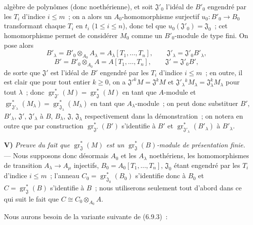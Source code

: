
algèbre de polynômes (donc noethérienne), et soit $\mathfrak J'_0$ l'idéal de
$B'_0$ engendré par les $T_i$ d'indice $i\leq m$~; on a alors un
$A_0$-homomorphisme surjectif $u_0:B'_0\to B_0$ transformant chaque $T_i$ en
$t_i$ ($1\leq i\leq n$), donc tel que $u_0(\mathfrak J'_0)=\mathfrak J_0$~;
cet homomorphisme permet de considérer $M_0$ comme un $B'_0$-module de type
fini. On pose alors
\[
B'_\lambda=B'_0\otimes_{A_0}A_\lambda
=A_\lambda[T_1,\ldots,T_n],\qquad
\mathfrak J'_\lambda=\mathfrak J'_0B'_\lambda,
\]
\[
B'=B'_0\otimes_{A_0}A=A[T_1,\ldots,T_n],\qquad
\mathfrak J'=\mathfrak J'_0B',
\]
de sorte que $\mathfrak J'$ est l'idéal de $B'$ engendré par les $T_i$
d'indice $i\leq m$~; en outre, il est clair que pour tout entier $k\geq0$,
on a $\mathfrak J'^kM=\mathfrak J^kM$ et
$\mathfrak J'_\lambda{}^kM_\lambda=\mathfrak J_\lambda^kM_\lambda$ pour tout
$\lambda$~; donc
$\operatorname{gr}_{\mathfrak J'}^*(M)=\operatorname{gr}_{\mathfrak J}^*(M)$
en tant que $A$-module et
$\operatorname{gr}_{\mathfrak J'_\lambda}^*(M_\lambda)
=\operatorname{gr}_{\mathfrak J_\lambda}^*(M_\lambda)$ en tant que
$A_\lambda$-module~; on peut donc substituer $B'$, $B'_\lambda$,
$\mathfrak J'$, $\mathfrak J'_\lambda$ à $B$, $B_\lambda$, $\mathfrak J$,
$\mathfrak J_\lambda$ respectivement dans la démonstration~; on notera en
outre que par construction $\operatorname{gr}_{\mathfrak J'}^*(B')$
s'identifie à $B'$ et $\operatorname{gr}_{\mathfrak J'_\lambda}^*(B'_\lambda)$
à $B'_\lambda$.

\medskip
\noindent\textbf{V)} \emph{Preuve du fait que
$\operatorname{gr}_{\mathfrak J}^*(M)$ est un
$\operatorname{gr}_{\mathfrak J}^*(B)$-module de présentation finie.} --- Nous
supposons donc désormais $A_0$ et les $A_\lambda$ noethériens, les
homomorphismes de transition $A_\lambda\to A_\mu$ injectifs,
$B_0=A_0[T_1,\ldots,T_n]$, $\mathfrak J_0$ étant engendré par les $T_i$
d'indice $i\leq m$~; l'anneau
$C_0=\operatorname{gr}_{\mathfrak J_0}^*(B_0)$ s'identifie donc à $B_0$ et
$C=\operatorname{gr}_{\mathfrak J}^*(B)$ s'identifie à $B$~; nous utiliserons
seulement tout d'abord dans ce qui suit le fait que
$C\cong C_0\otimes_{A_0}A$.

Nous aurons besoin de la variante suivante de (6.9.3)~:

